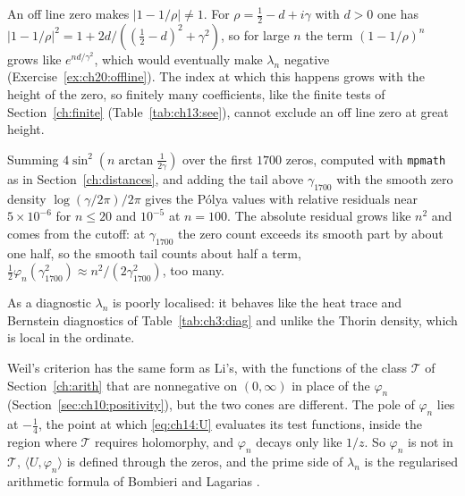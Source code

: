 An off line zero makes $|1-1/\rho|\ne1$. For $\rho=\frac12-d+i\gamma$ with $d>0$ one has $|1-1/\rho|^2=1+2d/((\frac12-d)^2+\gamma^2)$, so for large $n$ the term $(1-1/\rho)^n$ grows like $e^{nd/\gamma^2}$, which would eventually make $\lambda_n$ negative (Exercise~\ref{ex:ch20:offline}). The index at which this happens grows with the height of the zero, so finitely many coefficients, like the finite tests of Section~\ref{ch:finite} (Table~\ref{tab:ch13:see}), cannot exclude an off line zero at great height.

Summing $4\sin^2(n\arctan\frac1{2\gamma})$ over the first $1700$ zeros, computed with \texttt{mpmath} \cite{mpmath} as in Section~\ref{ch:distances}, and adding the tail above $\gamma_{1700}$ with the smooth zero density $\log(\gamma/2\pi)/2\pi$ gives the P\'olya values with relative residuals near $5\times10^{-6}$ for $n\le20$ and $10^{-5}$ at $n=100$. The absolute residual grows like $n^2$ and comes from the cutoff: at $\gamma_{1700}$ the zero count exceeds its smooth part by about one half, so the smooth tail counts about half a term, $\frac12\varphi_n(\gamma_{1700}^2)\approx n^2/(2\gamma_{1700}^2)$, too many.

As a diagnostic $\lambda_n$ is poorly localised: it behaves like the heat trace and Bernstein diagnostics of Table~\ref{tab:ch3:diag} and unlike the Thorin density, which is local in the ordinate.

Weil's criterion has the same form as Li's, with the functions of the class $\mathcal T$ of Section~\ref{ch:arith} that are nonnegative on $(0,\infty)$ in place of the $\varphi_n$ (Section~\ref{sec:ch10:positivity}), but the two cones are different. The pole of $\varphi_n$ lies at $-\frac14$, the point at which \eqref{eq:ch14:U} evaluates its test functions, inside the region where $\mathcal T$ requires holomorphy, and $\varphi_n$ decays only like $1/z$. So $\varphi_n$ is not in $\mathcal T$, $\langle U,\varphi_n\rangle$ is defined through the zeros, and the prime side of $\lambda_n$ is the regularised arithmetic formula of Bombieri and Lagarias \cite{BL99}.
